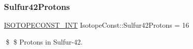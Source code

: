 \subsubsection{\texorpdfstring{Sulfur42\+Protons}{Sulfur42Protons}}
{\footnotesize\ttfamily \mbox{\hyperlink{group___isotope_const-_macros_ga5f18360b3e99483a35c32d789e62621c}{I\+S\+O\+T\+O\+P\+E\+C\+O\+N\+S\+T\+\_\+\+I\+NT}} Isotope\+Const\+::\+Sulfur42\+Protons = 16}

\$ \$ Protons in Sulfur-\/42. 